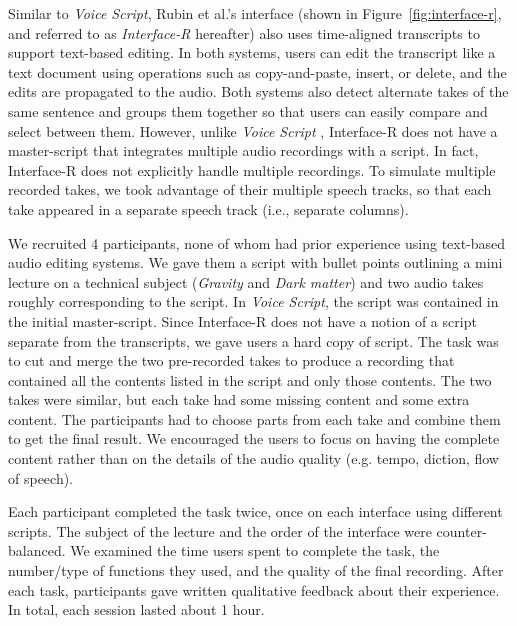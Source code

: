 Similar to \textit{Voice Script}, Rubin et al.'s interface (shown in Figure~\ref{fig:interface-r}, and referred to as
\textit{Interface-R} hereafter) also uses time-aligned transcripts to support text-based editing. In both systems, users
can edit the transcript like a text document using operations
such as copy-and-paste, insert, or delete, and the edits are propagated
to the audio. Both systems also detect alternate takes of the
same sentence and groups them together so that users can easily compare and select between them.
However, unlike \textit{Voice Script} , Interface-R does not have a master-script that integrates multiple audio recordings with a script. In fact, Interface-R does not explicitly handle multiple recordings. To simulate
multiple recorded takes, we took advantage of their multiple speech tracks,
so that each take appeared in a separate speech track (i.e., separate columns).

We recruited 4 participants, none of whom had
prior experience using text-based audio editing systems. We gave them
a script with bullet points outlining a mini lecture on a technical
subject (\textit{Gravity} and \textit{Dark matter}) and
two audio takes roughly corresponding to the script. In \textit{Voice Script}, the script was contained in the initial master-script. Since Interface-R does not have a notion of
a script separate from the transcripts, we gave users a hard copy
of script. The task
was to cut and merge the two pre-recorded takes to produce a recording that
contained all the contents listed in the script and only those
contents. The two takes were similar, but each take had some
missing content and some extra
content. The participants had to choose parts from each take
and combine them to get the final result. We encouraged the users
to focus on having the complete content rather than on the details
of the audio quality (e.g. tempo, diction, flow of speech).

Each participant completed the task twice, once on each interface using different scripts.
The subject of the lecture and the order of the interface were
counter-balanced. We examined the time users spent to complete the task, the number/type of functions they used, and the quality of the
final recording. After each task, participants gave written
qualitative feedback about their experience. In total, each session lasted about 1 hour. 
